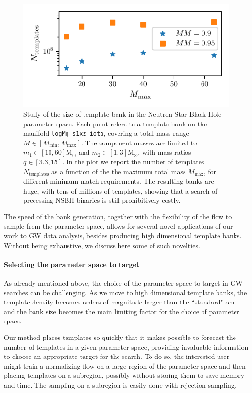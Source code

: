 \documentclass[twocolumn,showpacs,preprintnumbers,nofootinbib,prd,
superscriptaddress,10pt]{revtex4-2}
\begin{document}
\begin{figure}[t]
	\centering
	\includegraphics[scale = 1.]{NSBH_size}
	\caption{Study of the size of template bank in the Neutron Star-Black Hole parameter space. Each point refers to a template bank on the manifold \texttt{logMq\_s1xz\_iota}, covering a total mass range $M\in[M_\text{min}, M_\text{max}]$. The component masses are limited to $m_1 \in [10, 60] \mathrm{M_\odot}$ and  $m_2 \in [1, 3] \mathrm{M_\odot}$, with mass ratios $q \in [3.3, 15]$. In the plot we report the number of templates $N_\text{templates}$ as a function of the the maximum total mass $M_\text{max}$, for different minimum match requirements. The resulting banks are huge, with tens of millions of templates, showing that a search of precessing NSBH binaries is still prohibitively costly.}
	\label{fig:NSBH_size}
\end{figure}

The speed of the bank generation, together with the flexibility of the flow to sample from the parameter space, allows for several novel applications of our work to GW data analysis, besides producing high dimensional template banks.
Without being exhaustive, we discuss here some of such novelties.


\paragraph{Selecting the parameter space to target}
As already mentioned above, the choice of the parameter space to target in GW searches can be challenging. As we move to high dimensional template banks, the template density becomes orders of magnitude larger than the ``standard" one and the bank size becomes the main limiting factor for the choice of parameter space.

Our method places templates so quickly that it makes possible to forecast the number of templates in a given parameter space, providing invaluable information to choose an appropriate target for the search.
To do so, the interested user might train a normalizing flow on a large region of the parameter space and then placing templates on a subregion, possibly without storing them to save memory and time. The sampling on a subregion is easily done with rejection sampling.
\end{document}
